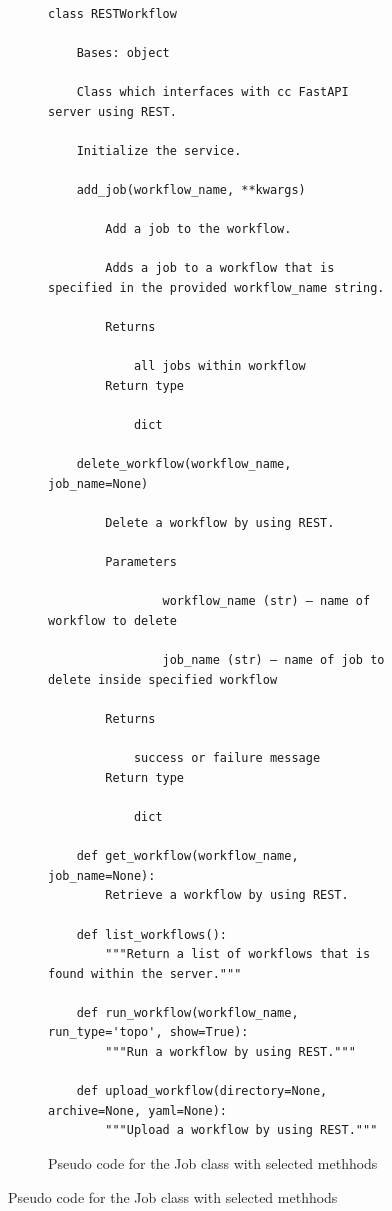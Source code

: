 \begin{figure}[htb]
\begin{verbatim}
\end{verbatim}



\begin{figure}[htb]
\caption{Pseudo code for the Job class with selected methhods}
\label{fig:code-workflow-rest}
\begin{verbatim}

class RESTWorkflow

    Bases: object

    Class which interfaces with cc FastAPI server using REST.

    Initialize the service.

    add_job(workflow_name, **kwargs)

        Add a job to the workflow.

        Adds a job to a workflow that is specified in the provided workflow_name string.

        Returns

            all jobs within workflow
        Return type

            dict

    delete_workflow(workflow_name, job_name=None)

        Delete a workflow by using REST.

        Parameters

                workflow_name (str) – name of workflow to delete

                job_name (str) – name of job to delete inside specified workflow

        Returns

            success or failure message
        Return type

            dict

    def get_workflow(workflow_name, job_name=None):
        Retrieve a workflow by using REST.

    def list_workflows():
        """Return a list of workflows that is found within the server."""

    def run_workflow(workflow_name, run_type='topo', show=True):
        """Run a workflow by using REST."""

    def upload_workflow(directory=None, archive=None, yaml=None):
        """Upload a workflow by using REST."""
\end{verbatim}


\end{figure}
\end{figure}
